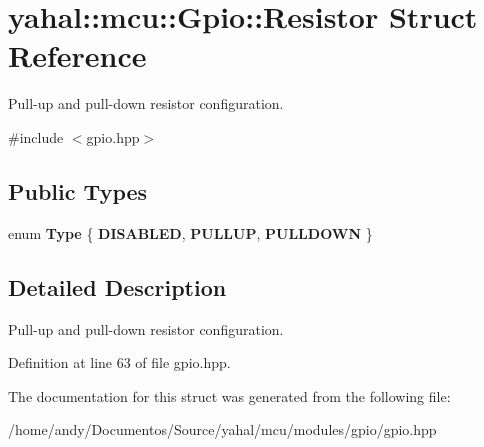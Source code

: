 \hypertarget{structyahal_1_1mcu_1_1_gpio_1_1_resistor}{}\section{yahal\+:\+:mcu\+:\+:Gpio\+:\+:Resistor Struct Reference}
\label{structyahal_1_1mcu_1_1_gpio_1_1_resistor}


Pull-\/up and pull-\/down resistor configuration.  




{\ttfamily \#include $<$gpio.\+hpp$>$}

\subsection*{Public Types}
\begin{DoxyCompactItemize}
\item 
\hypertarget{structyahal_1_1mcu_1_1_gpio_1_1_resistor_a8f38e7b4a5f4a55cbc6b4d6f94c0f4e5}{}enum {\bfseries Type} \{ {\bfseries D\+I\+S\+A\+B\+L\+E\+D}, 
{\bfseries P\+U\+L\+L\+U\+P}, 
{\bfseries P\+U\+L\+L\+D\+O\+W\+N}
 \}\label{structyahal_1_1mcu_1_1_gpio_1_1_resistor_a8f38e7b4a5f4a55cbc6b4d6f94c0f4e5}

\end{DoxyCompactItemize}


\subsection{Detailed Description}
Pull-\/up and pull-\/down resistor configuration. 

Definition at line 63 of file gpio.\+hpp.



The documentation for this struct was generated from the following file\+:\begin{DoxyCompactItemize}
\item 
/home/andy/\+Documentos/\+Source/yahal/mcu/modules/gpio/gpio.\+hpp\end{DoxyCompactItemize}
